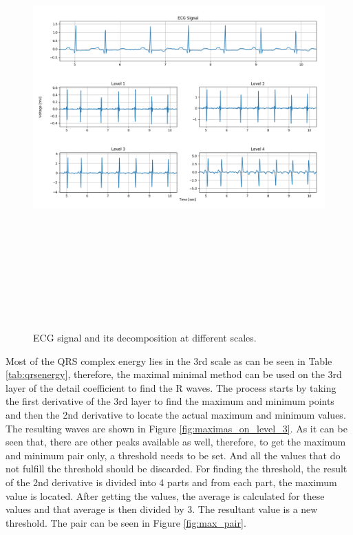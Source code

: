 \begin{figure}[htpb]
	\centering
	\includegraphics[width=17cm,height=17cm,keepaspectratio=true]{images/detail_coefficients}
	\caption{
		ECG signal and its decomposition at different scales.
	}
	\label{fig:detail_coefficients}
\end{figure}

Most of the QRS complex energy lies in the 3rd scale as can be seen in Table \ref{tab:qrsenergy}, therefore, the maximal minimal method can be used on the 3rd layer of the detail coefficient to find the R waves.  The process starts by taking the first derivative of the 3rd layer to find the maximum and minimum points and then the 2nd derivative to locate the actual maximum and minimum values. The resulting waves are shown in Figure \ref{fig:maximas_on_level_3}. As it can be seen that, there are other peaks available as well, therefore, to get the maximum and minimum pair only, a threshold needs to be set. And all the values that do not fulfill the threshold should be discarded. 
For finding the threshold, the result of the 2nd derivative is divided into 4 parts and from each part, the maximum value is located. After getting the values, the average is calculated for these values and that average is then divided by 3. The resultant value is a new threshold. The pair can be seen in Figure \ref{fig:max_pair}.


